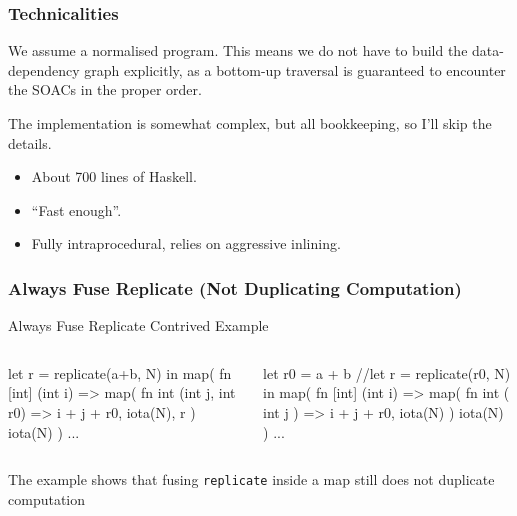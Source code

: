 \documentclass{beamer}
\newcommand{\emp}[1]{\textcolor{DikuRed}{ #1}}
\begin{document}
\begin{frame}[fragile,t]
  \frametitle{Technicalities}

  We assume a normalised program.  This means we do not have to build
  the data-dependency graph explicitly, as a bottom-up traversal is
  guaranteed to encounter the SOACs in the proper order.

  The implementation is somewhat complex, but all bookkeeping, so I'll
  skip the details.

  \begin{itemize}
    \item About 700 lines of Haskell.
    \item ``Fast enough''.
    \item Fully intraprocedural, relies on aggressive inlining.
  \end{itemize}
\end{frame}

\begin{frame}[fragile]
  \frametitle{Always Fuse Replicate (Not Duplicating Computation)}

\begin{block}{ Always Fuse Replicate Contrived Example }
\begin{columns}
\vspace{-2ex}
\begin{colorcode}[fontsize=\scriptsize]
let \emp{r} = replicate(a+b, N) in
map( fn [int] (int i) =>
        map( fn int (int j, int r0)
                 => i + j + \emp{r0},
              iota(N), \emp{r}
            )
      iota(N)
    ) ...
\end{colorcode}
\vspace{-2ex}
\begin{colorcode}[fontsize=\scriptsize]
let \emp{r0} = a + b
//let \emp{r}  = replicate(r0, N) in
map( fn [int] (int i) =>
        map( fn int ( int j )
                  => i + j + \emp{r0},
              iota(N)
            )
      iota(N)
    ) ...
\end{colorcode}
\end{columns}
\end{block}

\bigskip

The example shows that fusing {\tt replicate} \emp{inside} a map
still does not duplicate computation

\end{frame}
\end{document}
